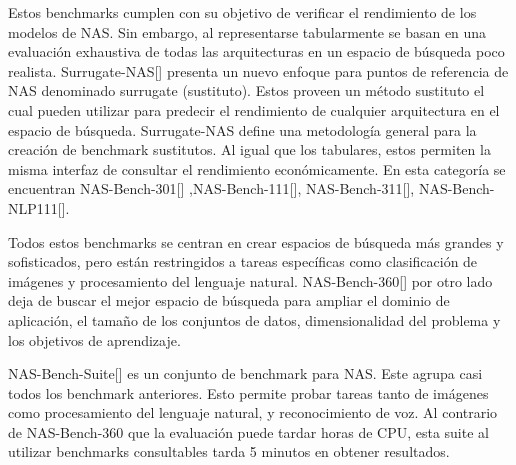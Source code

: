 Estos benchmarks cumplen con su objetivo de verificar el rendimiento de los modelos de NAS. Sin embargo, al representarse tabularmente se basan en una 
evaluación exhaustiva de todas las arquitecturas en un espacio de búsqueda poco realista. Surrugate-NAS[\cite{66}] presenta un nuevo enfoque para puntos de 
referencia de NAS denominado surrugate (sustituto). Estos proveen un método sustituto el cual pueden utilizar para predecir el rendimiento de cualquier arquitectura 
en el espacio de búsqueda. Surrugate-NAS define una metodología general para la creación de benchmark sustitutos. Al igual que los tabulares, estos permiten la 
misma interfaz de consultar el rendimiento económicamente. En esta categoría se encuentran NAS-Bench-301[\cite{57}] ,NAS-Bench-111[\cite{58}], 
NAS-Bench-311[\cite{58}], NAS-Bench-NLP111[\cite{58}].

Todos estos benchmarks se centran en crear espacios de búsqueda más grandes y sofisticados, pero están restringidos a tareas específicas como clasificación de imágenes 
y procesamiento del lenguaje natural. NAS-Bench-360[\cite{51}] por otro lado deja de buscar el mejor espacio de búsqueda para ampliar el dominio de aplicación, el 
tamaño de los conjuntos de datos, dimensionalidad del problema y los objetivos de aprendizaje.

NAS-Bench-Suite[\cite{58}] es un conjunto de benchmark para NAS. Este agrupa casi todos los benchmark anteriores. Esto permite probar tareas tanto de 
imágenes como procesamiento del lenguaje natural, y reconocimiento de voz. Al contrario de NAS-Bench-360 que la evaluación puede tardar horas de CPU, esta suite al 
utilizar benchmarks consultables tarda 5 minutos en obtener resultados.




    
      
